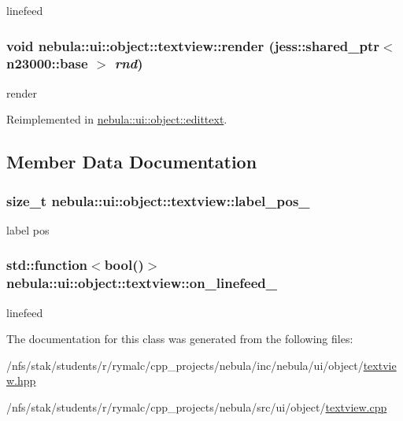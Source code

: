 linefeed \hypertarget{classnebula_1_1ui_1_1object_1_1textview_af2b39e3d0d5b21d2195682826f483de7}{
\subsubsection[{render}]{\setlength{\rightskip}{0pt plus 5cm}void nebula::ui::object::textview::render (jess::shared\_\-ptr$<$ {\bf n23000::base} $>$ {\em rnd})}}
\label{classnebula_1_1ui_1_1object_1_1textview_af2b39e3d0d5b21d2195682826f483de7}


render 

Reimplemented in \hyperlink{classnebula_1_1ui_1_1object_1_1edittext_a824a31e2e8f8407a4cfb413b877c726c}{nebula::ui::object::edittext}.

\subsection{Member Data Documentation}
\hypertarget{classnebula_1_1ui_1_1object_1_1textview_ad8c71f9fc11c3d4787bbc88701d55b82}{
\subsubsection[{label\_\-pos\_\-}]{\setlength{\rightskip}{0pt plus 5cm}size\_\-t {\bf nebula::ui::object::textview::label\_\-pos\_\-}}}
\label{classnebula_1_1ui_1_1object_1_1textview_ad8c71f9fc11c3d4787bbc88701d55b82}


label pos \hypertarget{classnebula_1_1ui_1_1object_1_1textview_ae6966d898780eddaba77197d6efab38a}{
\subsubsection[{on\_\-linefeed\_\-}]{\setlength{\rightskip}{0pt plus 5cm}std::function$<$bool()$>$ {\bf nebula::ui::object::textview::on\_\-linefeed\_\-}}}
\label{classnebula_1_1ui_1_1object_1_1textview_ae6966d898780eddaba77197d6efab38a}


linefeed 

The documentation for this class was generated from the following files:\begin{DoxyCompactItemize}
\item 
/nfs/stak/students/r/rymalc/cpp\_\-projects/nebula/inc/nebula/ui/object/\hyperlink{textview_8hpp}{textview.hpp}\item 
/nfs/stak/students/r/rymalc/cpp\_\-projects/nebula/src/ui/object/\hyperlink{textview_8cpp}{textview.cpp}\end{DoxyCompactItemize}
